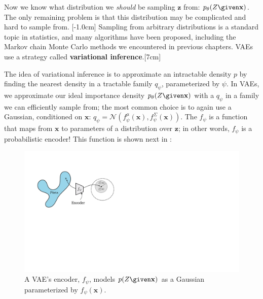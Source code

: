 Now we know what distribution we \textit{should} be sampling $\mathbf{z}$ from: $p_{\theta}(Z \given \mathbf{x})$. The only remaining problem is that this distribution may be complicated and hard to sample from. [-1.0cm]
Sampling from arbitrary distributions is a standard topic in statistics, and many algorithms have been proposed, including the Markov chain Monte Carlo methods we encountered in previous chapters. VAEs use a strategy called \textbf{variational inference}.[7cm]

The idea of variational inference is to approximate an intractable density $p$ by finding the nearest density in a tractable family $q_{\psi}$, parameterized by $\psi$. In VAEs, we approximate our ideal importance density $p_{\theta}(Z \given \mathbf{x})$ with a $q_{\psi}$ in a family we can efficiently sample from; the most common choice is to again use a Gaussian, conditioned on $\mathbf{x}$: $q_{\psi} = \mathcal{N}(f_{\psi}^{\mu}(\mathbf{x}), f_{\psi}^{\Sigma}(\mathbf{x}))$. The $f_{\psi}$ is a function that maps from $\mathbf{x}$ to parameters of a distribution over $\mathbf{z}$; in other words, $f_{\psi}$ is a probabilistic encoder! This function is shown next in \fig{\ref{fig:generative_modeling_and_representation_learning:VAE_encoder}}:
\begin{figure}[h!]
    \centerline{
    \includegraphics[width=0.55\linewidth]{./figures/generative_modeling_and_representation_learning/VAE_encoder.pdf}
    }
    \caption{A VAE's encoder, $f_{\psi}$, models $p(Z \given \mathbf{x})$ as a Gaussian parameterized by $f_{\psi}(\mathbf{x})$.}
    \label{fig:generative_modeling_and_representation_learning:VAE_encoder}
\end{figure}


